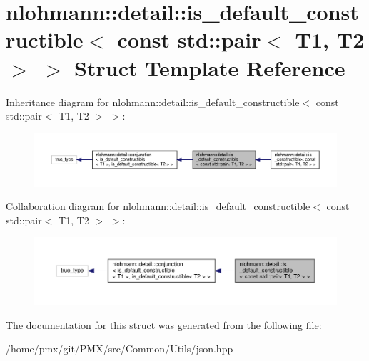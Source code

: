 \hypertarget{structnlohmann_1_1detail_1_1is__default__constructible_3_01const_01std_1_1pair_3_01T1_00_01T2_01_4_01_4}{}\section{nlohmann\+:\+:detail\+:\+:is\+\_\+default\+\_\+constructible$<$ const std\+:\+:pair$<$ T1, T2 $>$ $>$ Struct Template Reference}
\label{structnlohmann_1_1detail_1_1is__default__constructible_3_01const_01std_1_1pair_3_01T1_00_01T2_01_4_01_4}


Inheritance diagram for nlohmann\+:\+:detail\+:\+:is\+\_\+default\+\_\+constructible$<$ const std\+:\+:pair$<$ T1, T2 $>$ $>$\+:
\nopagebreak
\begin{figure}[H]
\begin{center}
\leavevmode
\includegraphics[width=350pt]{structnlohmann_1_1detail_1_1is__default__constructible_3_01const_01std_1_1pair_3_01T1_00_01T2_01_4_01_4__inherit__graph}
\end{center}
\end{figure}


Collaboration diagram for nlohmann\+:\+:detail\+:\+:is\+\_\+default\+\_\+constructible$<$ const std\+:\+:pair$<$ T1, T2 $>$ $>$\+:
\nopagebreak
\begin{figure}[H]
\begin{center}
\leavevmode
\includegraphics[width=350pt]{structnlohmann_1_1detail_1_1is__default__constructible_3_01const_01std_1_1pair_3_01T1_00_01T2_01_4_01_4__coll__graph}
\end{center}
\end{figure}


The documentation for this struct was generated from the following file\+:\begin{DoxyCompactItemize}
\item 
/home/pmx/git/\+P\+M\+X/src/\+Common/\+Utils/json.\+hpp\end{DoxyCompactItemize}
